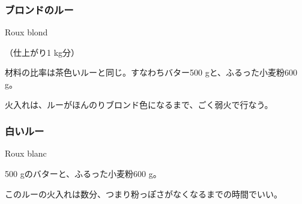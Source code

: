 \begin{recette}
\atoaki{}

\hypertarget{roux-blond}{%
\subsubsection{ブロンドのルー}\label{roux-blond}}

\begin{frsubenv}

Roux blond

\end{frsubenv}

 

（仕上がり1 kg分）

材料の比率は茶色いルーと同じ。すなわちバター500 gと、ふるった小麦粉600
g。

火入れは、ルーがほんのりブロンド色になるまで、ごく弱火で行なう。

\atoaki{}

\hypertarget{roux-blanc}{%
\subsubsection{白いルー}\label{roux-blanc}}

\begin{frsubenv}

Roux blanc

\end{frsubenv}

 
 

500 gのバターと、ふるった小麦粉600 g。

このルーの火入れは数分、つまり粉っぽさがなくなるまでの時間でいい。

 

\end{recette}
